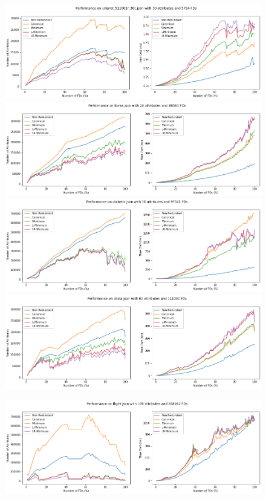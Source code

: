 \documentclass[11pt]{book}
\begin{document}
\begin{figure}
	\centering
	\includegraphics[width=\textwidth]{./diagrams/lab1/uniprot.png}
	\includegraphics[width=\textwidth]{./diagrams/lab1/horse.png}
	\includegraphics[width=\textwidth]{./diagrams/lab1/diabetic.png}
	\includegraphics[width=\textwidth]{./diagrams/lab1/plista.png}
\end{figure}

\begin{figure}
	\centering
	\includegraphics[width=\textwidth]{./diagrams/lab1/flight.png}
\end{figure}
\end{document}
